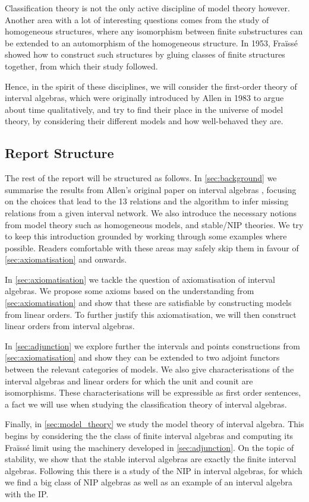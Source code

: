 Classification theory is not the only active discipline of model theory however. Another
area with a lot of interesting questions comes from the study of homogeneous structures,
where any isomorphism between finite substructures can be extended to an automorphism of
the homogeneous structure. In 1953, Fraïssé showed how to construct such structures
by gluing classes of finite structures together, from which their study followed.

Hence, in the spirit of these disciplines, we will consider the first-order theory of
interval algebras, which were originally introduced by Allen in 1983 to argue about time
qualitatively, and try to find their place in the universe of model
theory, by considering their different models and how well-behaved they are.

\subsection{Report Structure}%
\label{sub:report_structure}

The rest of the report will be structured as follows. In
\cref{sec:background} we summarise the results from Allen's original paper
on interval algebras \cite{allen83}, focusing on the choices that lead to
the 13 relations and the algorithm to infer missing relations from a given
interval network. We also introduce the necessary notions from model theory
such as homogeneous models, and stable/NIP theories. We try to keep this
introduction grounded by working through some examples where possible.
Readers comfortable with these areas may safely skip them in favour of
\cref{sec:axiomatisation} and onwards.

In \cref{sec:axiomatisation} we tackle the question of axiomatisation of
interval algebras. We propose some axioms based on the understanding from
\cref{sec:axiomatisation} and show that these are satisfiable by
constructing models from linear orders. To further justify this
axiomatisation, we will then construct linear orders from interval
algebras.

In \cref{sec:adjunction} we explore further the intervals and points
constructions from \cref{sec:axiomatisation} and show they can be extended to two adjoint
functors between the relevant categories of models. We also give characterisations of
the interval algebras and linear orders for which the unit and counit are isomorphisms.
These characterisations will be expressible as first order sentences, a fact we will use
when studying the classification theory of interval algebras.

Finally, in \cref{sec:model_theory} we study the model theory of interval algebra. This
begins by considering the the class of finite interval algebras and computing its
Fraïssé limit using the machinery developed in \cref{sec:adjunction}. On the topic of
stability, we show that the stable interval algebras are exactly the finite interval
algebras. Following this there is a study of the NIP in interval algebras, for which
we find a big class of NIP algebras as well as an example of an interval algebra with the
IP.

